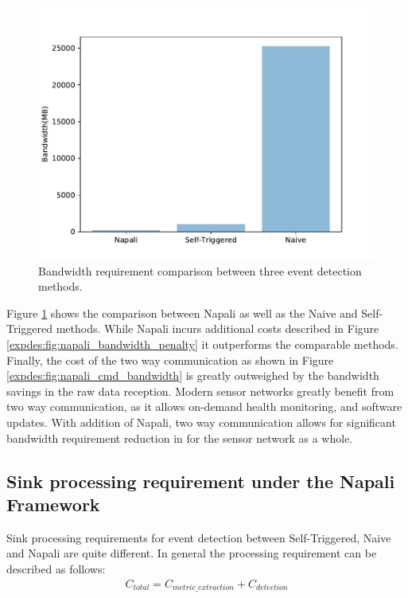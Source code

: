 \begin{figure}[ht!]
    \centering
    \includegraphics[width=0.8\linewidth]{img/napali_eval/napali_bandwidth_comparison.pdf}
    \caption{Bandwidth requirement comparison between three event detection methods.}
    \label{expdes:fig:bandwidth_master_comparison}
\end{figure}

Figure \ref{expdes:fig:bandwidth_master_comparison} shows the comparison between Napali as well as the Naive and Self-Triggered methods.
While Napali incurs additional costs described in Figure \ref{expdes:fig:napali_bandwidth_penalty} it outperforms the comparable methods.
Finally, the cost of the two way communication as shown in Figure \ref{expdes:fig:napali_cmd_bandwidth} is greatly outweighed by the bandwidth savings in the raw data reception.
Modern sensor networks greatly benefit from two way communication, as it allows on-demand health monitoring, and software updates.
With addition of Napali, two way communication allows for significant bandwidth requirement reduction in for the sensor network as a whole.

\subsection{Sink processing requirement under the Napali Framework}\label{subsec:sink-processing-requirement-under-the-napali-framework}
Sink processing requirements for event detection between Self-Triggered, Naive and Napali are quite different.
In general the processing requirement can be described as follows:
\begin{equation}\label{eq:detection_cost}
\begin{aligned}
    C_{total} = C_{metric\_extraction} + C_{detection}
\end{aligned}
\end{equation}

